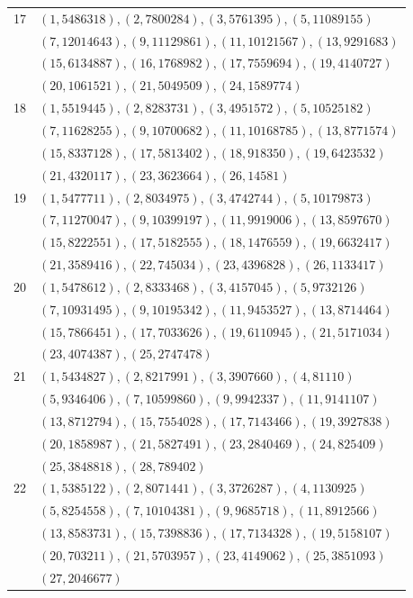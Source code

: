 \begin{longtable}{r p{}}
17 & $(1,5486318), (2,7800284), (3,5761395), (5,11089155)$ \\[2pt]
 & $(7,12014643), (9,11129861), (11,10121567), (13,9291683)$ \\[2pt]
 & $(15,6134887), (16,1768982), (17,7559694), (19,4140727)$ \\[2pt]
 & $(20,1061521), (21,5049509), (24,1589774)$ \\[2pt]
18 & $(1,5519445), (2,8283731), (3,4951572), (5,10525182)$ \\[2pt]
 & $(7,11628255), (9,10700682), (11,10168785), (13,8771574)$ \\[2pt]
 & $(15,8337128), (17,5813402), (18,918350), (19,6423532)$ \\[2pt]
 & $(21,4320117), (23,3623664), (26,14581)$ \\[2pt]
19 & $(1,5477711), (2,8034975), (3,4742744), (5,10179873)$ \\[2pt]
 & $(7,11270047), (9,10399197), (11,9919006), (13,8597670)$ \\[2pt]
 & $(15,8222551), (17,5182555), (18,1476559), (19,6632417)$ \\[2pt]
 & $(21,3589416), (22,745034), (23,4396828), (26,1133417)$ \\[2pt]
20 & $(1,5478612), (2,8333468), (3,4157045), (5,9732126)$ \\[2pt]
 & $(7,10931495), (9,10195342), (11,9453527), (13,8714464)$ \\[2pt]
 & $(15,7866451), (17,7033626), (19,6110945), (21,5171034)$ \\[2pt]
 & $(23,4074387), (25,2747478)$ \\[2pt]
21 & $(1,5434827), (2,8217991), (3,3907660), (4,81110)$ \\[2pt]
 & $(5,9346406), (7,10599860), (9,9942337), (11,9141107)$ \\[2pt]
 & $(13,8712794), (15,7554028), (17,7143466), (19,3927838)$ \\[2pt]
 & $(20,1858987), (21,5827491), (23,2840469), (24,825409)$ \\[2pt]
 & $(25,3848818), (28,789402)$ \\[2pt]
22 & $(1,5385122), (2,8071441), (3,3726287), (4,1130925)$ \\[2pt]
 & $(5,8254558), (7,10104381), (9,9685718), (11,8912566)$ \\[2pt]
 & $(13,8583731), (15,7398836), (17,7134328), (19,5158107)$ \\[2pt]
 & $(20,703211), (21,5703957), (23,4149062), (25,3851093)$ \\[2pt]
 & $(27,2046677)$ \\[2pt]

\end{longtable}
